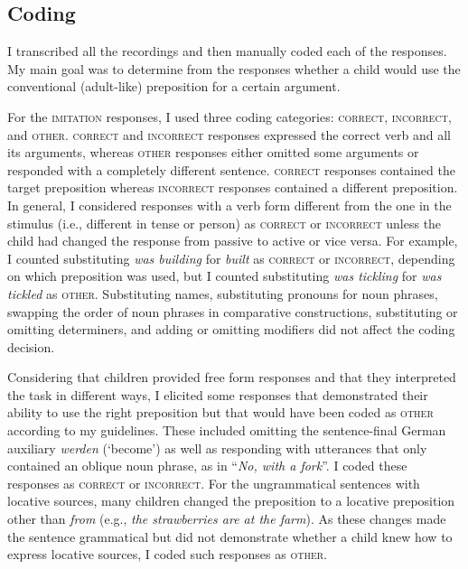 \documentclass[lucida]{sp} %
\begin{document}
\subsection{Coding}

I transcribed all the recordings and then manually coded each of the responses. My main goal was to determine from the responses whether a child would use the conventional (adult-like) preposition for a certain argument.

For the \textsc{imitation} responses, I used three coding categories: \textsc{correct}, \textsc{incorrect}, and \textsc{other}. \textsc{correct} and \textsc{incorrect} responses expressed the correct verb and all its arguments, whereas \textsc{other} responses either omitted some arguments or responded with a completely different sentence. \textsc{correct} responses contained the target preposition whereas \textsc{incorrect} responses contained a different preposition. In general, I considered responses with a verb form different from the one in the stimulus (i.e., different in tense or person) as \textsc{correct} or \textsc{incorrect} unless the child had changed the response from passive to active or vice versa. For example, I counted substituting \textit{was building} for \textit{built} as \textsc{correct} or \textsc{incorrect}, depending on which preposition was used, but I counted substituting  \textit{was tickling} for \textit{was tickled} as \textsc{other}. Substituting names, substituting pronouns for noun phrases, swapping the order of noun phrases in comparative constructions, substituting or omitting determiners, and adding or omitting modifiers did not affect the coding decision.

Considering that children provided free form responses and that they interpreted the task in different ways, I elicited some responses that demonstrated their ability to use the right preposition but that would have been coded as \textsc{other} according to my guidelines. These included omitting the sentence-final German auxiliary \textit{werden} (`become') as well as responding with utterances that only contained an oblique noun phrase, as in  ``\textit{No, with a fork}''. I coded these responses as \textsc{correct} or \textsc{incorrect}. For the ungrammatical sentences with locative sources, many children changed the preposition to a locative preposition other than \textit{from} (e.g., \textit{the strawberries are at the farm}). As these changes made the sentence grammatical but did not demonstrate whether a child knew how to express locative sources, I coded such responses as \textsc{other}.   
\end{document}

